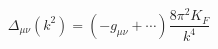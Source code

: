 \begin{equation}
\label{gluprop}
\Delta_{\mu\nu}(k^2)=(-g_{\mu\nu}+\cdots)\frac{ 8\pi^2K_F}{k^4}
\end{equation} 
